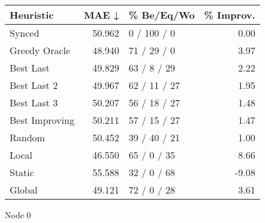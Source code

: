 \begin{tabular}{lrlr}
\toprule
\textbf{Heuristic} & \textbf{MAE ↓} & \textbf{\% Be/Eq/Wo} & \textbf{\% Improv.} \\
\midrule
            Synced &         50.962 &          0 / 100 / 0 &                0.00 \\
     Greedy Oracle &         48.940 &          71 / 29 / 0 &                3.97 \\
         Best Last &         49.829 &          63 / 8 / 29 &                2.22 \\
       Best Last 2 &         49.967 &         62 / 11 / 27 &                1.95 \\
       Best Last 3 &         50.207 &         56 / 18 / 27 &                1.48 \\
    Best Improving &         50.211 &         57 / 15 / 27 &                1.47 \\
            Random &         50.452 &         39 / 40 / 21 &                1.00 \\
             Local &         46.550 &          65 / 0 / 35 &                8.66 \\
            Static &         55.588 &          32 / 0 / 68 &               -9.08 \\
            Global &         49.121 &          72 / 0 / 28 &                3.61 \\
\bottomrule
\end{tabular}
\caption{Node 0}
\label{tab:non_lr05_le2_bs4_0}
